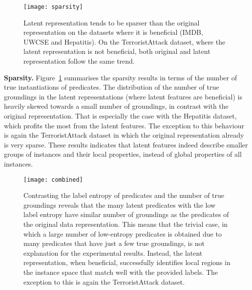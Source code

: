 \begin{figure}
	\centering
	\medskip
    \texttt{[image: sparsity]}
    \caption[Sparsity of latent representation created by \gls{curled}]{Latent representation tends to be sparser than the original representation on the datasets where it is beneficial (IMDB, UWCSE and Hepatitis). On the TerroristAttack dataset, where the latent representation is not beneficial, both original and latent representation follow the same trend. }
    \label{fig:Sparsity}
\end{figure}


\textbf{Sparsity.}
Figure~\ref{fig:Sparsity} summarises the sparsity results in terms of the number of true instantiations of predicates.
The distribution of the number of true groundings in the latent representations (where latent features are beneficial) is heavily skewed towards a small number of groundings, in contrast with the original representation.
That is especially the case with the Hepatitis dataset, which profits the most from the latent features.
The exception to this behaviour is again the TerroristAttack dataset in which the original representation already is very sparse.
These results indicates that latent features indeed describe smaller groups of instances and their local properties, instead of global properties of all instances.





\begin{figure}
	\centering
	\medskip
    \texttt{[image: combined]}
    \caption[Contrasting the label entropy and sparsity in latent representation created by \gls{curled}]{Contrasting the label entropy of predicates and the number of true groundings reveals that the many latent predicates with the low label entropy have similar number of groundings as the predicates of the original data representation. This means that the trivial case, in which a large number of low-entropy predicates is obtained due to many predicates that have just a few true groundings, is not explanation for the experimental results. Instead, the latent representation, when beneficial, successfully identifies local regions in the instance space that match well with the provided labels. The exception to this is again the TerroristAttack dataset.}
    \label{fig:EntropyVsSparsity}
\end{figure}




